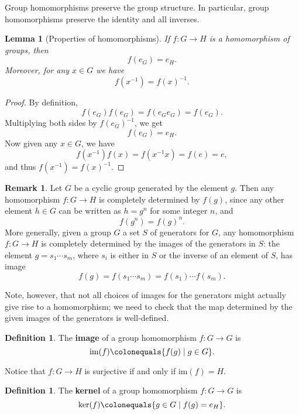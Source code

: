 \documentclass[12pt]{report}
\newtheorem{lemma}[theorem]{Lemma}
\numberwithin{equation}{section}
\numberwithin{theorem}{chapter}
\theoremstyle{definition}
\newtheorem{definition}[theorem]{Definition}
\newtheorem*{basic properties}{Basic Properties}
\newtheorem*{Important Remark}{Important Remark}
\newtheorem{remark}[theorem]{Remark}
\newcommand{\df}[1]{{\bf #1}\index{#1}}
\renewcommand{\ker}{\operatorname{ker}}
\begin{document}
Group homomorphisms preserve the group structure. In particular, group homomorphisms preserve the identity and all inverses.

\begin{lemma}[Properties of homomorphisms]\label{homomorphisms send 1 to 1}
	If $f: G \to H$ is a homomorphism of groups, then 
	$$f(e_G) = e_H.$$
	Moreover, for any $x \in G$ we have
	$$f(x^{-1}) = f(x)^{-1}.$$
\end{lemma}


\begin{proof}
By definition,
$$f(e_G)f(e_G) = f(e_Ge_G) = f(e_G).$$ 
Multiplying both sides by $f(e_G)^{-1}$, we get
$$f(e_G) = e_H.$$
Now given any $x \in G$, we have
$$f(x^{-1}) f(x) = f(x^{-1}x) = f(e) = e,$$ 
and thus $f(x^{-1}) = f(x)^{-1}$.
\end{proof}



\begin{remark}\label{homomorphism determined by generators}
Let $G$ be a cyclic group generated by the element $g$. Then any homomorphism $f\!: G \to H$ is completely determined by $f(g)$, since any other element $h \in G$ can be written as $h = g^n$ for some integer $n$, and
$$f(g^n) = f(g)^n.$$
More generally, given a group $G$ a set $S$ of generators for $G$, any homomorphism $f\!: G \longrightarrow H$ is completely determined by the images of the generators in $S$: the element $g = s_1 \cdots s_m$, where $s_i$ is either in $S$ or the inverse of an element of $S$, has image
$$f(g) = f(s_1 \cdots s_m) = f(s_1) \cdots f(s_m).$$

Note, however, that not all choices of images for the generators might actually give rise to a homomorphism; we need to check that the map determined by the given images of the generators is well-defined.
\end{remark}


\begin{definition}\index{$\ker(f)$}
The \df{image} of a group homomorphism $f\!: G \longrightarrow G$ is 
$$\mathrm{im}(f) \colonequals \{f(g) \mid g \in G \}.$$
\end{definition}

Notice that $f\!: G \to H$ is surjective if and only if $\mathrm{im}(f) = H$.


\begin{definition}\index{$\ker(f)$}
The \df{kernel} of a group homomorphism $f\!: G \longrightarrow G$ is 
$$\ker(f) \colonequals \{g \in G \mid f(g) = e_H\}.$$
\end{definition}
\end{document}
